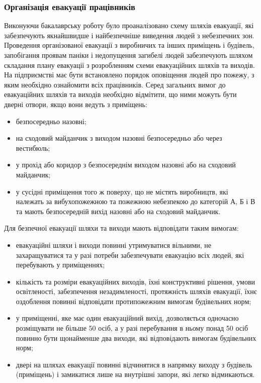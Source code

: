 \documentclass[12pt,a4paper]{article}
\begin{document}
\subsubsection{Організація евакуації працівників}
Виконуючи бакалаврську роботу було проаналізовано схему шляхів евакуації, які забезпечують якнайшвидше і найбезпечніше виведення людей з небезпечних зон.
Проведення організованої евакуації з виробничих та інших приміщень і будівель, запобігання проявам паніки і недопущення загибелі людей забезпечують шляхом складання плану евакуації з розробленням схеми евакуаційних шляхів та виходів. На підприємстві має бути встановлено порядок оповіщення людей про пожежу, з яким необхідно ознайомити всіх працівників. 
Серед загальних вимог до евакуаційних шляхів та виходів необхідно відмітити, що ними можуть бути дверні отвори, якщо вони ведуть з приміщень: 
\begin{itemize}
\item	безпосередньо назовні; 
\item	на сходовий майданчик з виходом назовні безпосередньо або через вестибюль; 
\item	у прохід або коридор з безпосереднім виходом назовні або на сходовий майданчик; 
\item	у сусідні приміщення того ж поверху, що не містять виробництв, які належать за вибухопожежною та пожежною небезпекою до категорій А, Б і В та мають безпосередній вихід назовні або на сходовий майданчик. 
\end{itemize}
Для безпечної евакуації шляхи та виходи мають відповідати таким вимогам: 
\begin{itemize}
\item	евакуаційні шляхи і виходи повинні утримуватися вільними, не захаращуватися та у разі потреби забезпечувати евакуацію всіх людей, які перебувають у приміщеннях;
\item	кількість та розміри евакуаційних виходів, їхні конструктивні рішення, умови освітленості, забезпечення незадимленості, протяжність шляхів евакуації, їхнє оздоблення повинні відповідати протипожежним вимогам будівельних норм;
\item	у приміщенні, яке має один евакуаційний вихід, дозволяється одночасно розміщувати не більше 50 осіб, а у разі перебування в ньому понад 50 осіб повинно бути щонайменше два виходи, які відповідають вимогам будівельних норм;
\item	двері на шляхах евакуації повинні відчинятися в напрямку виходу з будівель (приміщень) і замикатися лише на внутрішні запори, які легко відмикаються.
\end{itemize}
 
\end{document}
